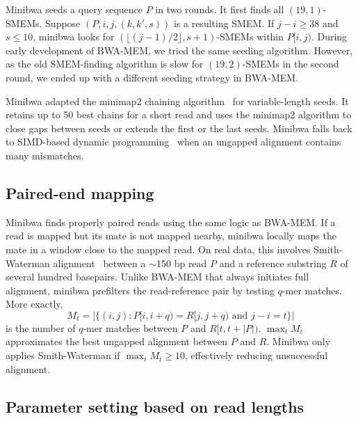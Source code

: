\documentclass[webpdf,contemporary,large,namedate]{oup-authoring-template}%
\begin{document}
Minibwa seeds a query sequence $P$ in two rounds.
It first finds all $(19,1)$-SMEMs.
Suppose $(P,i,j,(k,k',s))$ is a resulting SMEM.
If $j-i\ge38$ and $s\le10$,
minibwa looks for $(\lfloor(j-1)/2\rfloor,s+1)$-SMEMs within $P[i,j)$.
During early development of BWA-MEM, we tried the same seeding algorithm.
However, as the old SMEM-finding algorithm is slow for $(19,2)$-SMEMs in the second round,
we ended up with a different seeding strategy in BWA-MEM.

Minibwa adapted the minimap2 chaining algorithm~\citep{Li:2018ab} for variable-length seeds.
It retains up to 50 best chains for a short read
and uses the minimap2 algorithm to close gaps between seeds or extends the first or the last seeds.
Minibwa falls back to SIMD-based dynamic programming~\citep{Suzuki:2018aa} when an ungapped alignment contains many mismatches.


\subsection{Paired-end mapping}\label{sec:pe}

Minibwa finds properly paired reads using the same logic as BWA-MEM.
If a read is mapped but its mate is not mapped nearby,
minibwa locally maps the mate in a window close to the mapped read.
On real data, this involves Smith-Waterman alignment~\citep{Smith:1981aa,Farrar:2007hs} between a $\sim$150 bp read $P$ and a reference substring $R$ of several hundred basepairs.
Unlike BWA-MEM that always initiates full alignment,
minibwa prefilters the read-reference pair by testing $q$-mer matches.
More exactly,
$$
M_t=|\{(i,j):\mbox{$P[i,i+q)=R[j,j+q)$ and $j-i=t$}\}|
$$
is the number of $q$-mer matches between $P$ and $R[t,t+|P|)$.
$\max_t M_t$ approximates the best ungapped alignment between $P$ and $R$.
Minibwa only applies Smith-Waterman if $\max_t M_t\ge10$,
effectively reducing unsuccessful alignment.

\subsection{Parameter setting based on read lengths}
\end{document}
